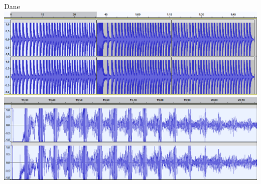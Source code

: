 \documentclass{beamer}
\begin{document}
\begin{frame}{Dane}
\includegraphics[width=\linewidth]{Data.png}
\includegraphics[width=\linewidth]{Data_zoom.png}
\end{frame}
\end{document}
